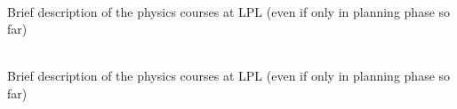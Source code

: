 \documentclass{report}
\begin{document}
 \\

Brief description of the physics courses at LPL (even if only in planning phase so far)

\clearpage
\begin{figure}
    \centering
\end{figure}
\clearpage

 \\

Brief description of the physics courses at LPL (even if only in planning phase so far)
\end{document}
